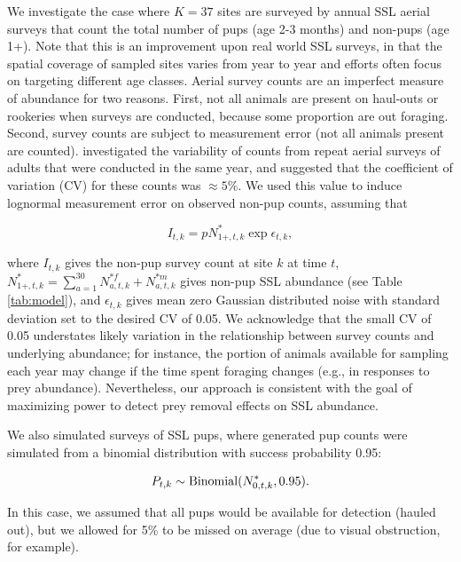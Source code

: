 \documentclass[nonumbib,leqno]{nrc1}
\begin{document}
We investigate the case where $K=37$ sites are surveyed by annual SSL aerial surveys that count the total
number of pups (age 2-3 months) and non-pups (age 1+).  Note that this is an improvement upon real world SSL surveys, in that the spatial coverage of sampled sites varies from year to year and efforts often focus on targeting different age classes. Aerial survey counts are an imperfect measure of abundance for two reasons.  First, not all animals are present on haul-outs or rookeries when surveys are conducted, because some proportion are out foraging.  Second, survey counts are subject to measurement error (not all animals present are counted).  \citet{HolmesEtAl2007} investigated the variability of counts from repeat aerial surveys of adults that were conducted in the same year, and suggested that the coefficient of variation (CV) for these counts was $\approx 5\%$.  We used this value to induce lognormal measurement error on observed non-pup counts, assuming that
\begin{linenomath}
  \begin{equation}
     I_{t,k} = p N_{1+,t,k}^{*}\exp{\epsilon_{t,k}},
  \end{equation}
\end{linenomath}
where $I_{t,k}$ gives the non-pup survey count at site $k$ at time $t$, $N_{1+,t,k}^*=\sum_{a=1}^{30} N_{a,t,k}^{*f}+N_{a,t,k}^{*m}$ gives non-pup SSL abundance (see Table \ref{tab:model}), and $\epsilon_{t,k}$ gives mean zero Gaussian distributed noise with standard deviation set to the desired CV of 0.05. We acknowledge that the small CV of 0.05 understates likely variation in the relationship between survey counts and underlying abundance; for instance, the portion of animals available for sampling each year may change if the time spent foraging changes (e.g., in responses to prey abundance).  Nevertheless, our approach is consistent with the goal of maximizing power to detect prey removal effects on SSL abundance.

We also simulated surveys of SSL pups, where generated pup counts were simulated from a binomial distribution with success probability 0.95:
\begin{linenomath}
  \begin{equation}
     P_{t,k} \sim {\rm Binomial}(N_{0,t,k}^*,0.95).
  \end{equation}
\end{linenomath}
In this case, we assumed that all pups would be available for detection (hauled out), but we allowed for 5\% to be missed on average (due to visual obstruction, for example).
\end{document}

